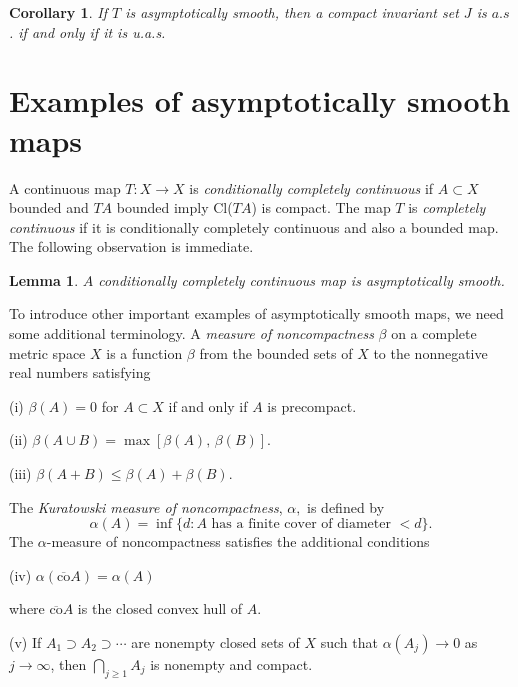 \documentclass{surv-l}
\theoremstyle{plain}
\newtheorem{corollary}[theorem]{Corollary}
\newtheorem{lemma}[theorem]{Lemma}
\theoremstyle{definition}
\numberwithin{equation}{section}
\numberwithin{figure}{chapter}
\begin{document}
\begin{corollary}\label{cor2.2.6} If $T$ is asymptotically smooth, then a compact invariant
set $J$ is $a.s$. if and only if it is u.a.s.
\end{corollary}

\section{Examples of asymptotically smooth maps}\label{sec2.3}

A continuous map $T\!:X\rightarrow X$ is \emph{conditionally completely continuous} if $A\subset X$ bounded and $TA$ bounded imply Cl($TA$) is compact. The map $T$ is \emph{completely continuous} if it is conditionally completely continuous and also a bounded map. The following observation is immediate.

\begin{lemma}\label{lem2.3.1} $A$ conditionally completely continuous map is asymptotically smooth.
\end{lemma}

To introduce other important examples of asymptotically smooth maps, we need some additional terminology. A \emph{measure of noncompactness} $\beta$ on a complete metric space $X$ is a function $\beta$ from the bounded sets of $X$ to the nonnegative real numbers satisfying

(i) $\beta(A)=0$ for $A\subset X$ if and only if $A$ is precompact.

(ii) $\beta(A\cup B)=\max[\beta(A), \, \beta(B)]$.

(iii) $\beta(A+B)\leq\beta(A)+\beta(B)$.

\noindent The \emph{Kuratowski measure of noncompactness}, $\alpha,$ is defined by
\begin{equation*}
\alpha(A)=\inf\{d\!:A  \text{ has a finite cover of diameter } <d\}.
\end{equation*}
The $\alpha$-measure of noncompactness satisfies the additional conditions

(iv) $\alpha(\overline{\mathrm{co}}A)=\alpha(A)$

where $\overline{\mathrm{co}}A$ is the closed convex hull of $A$.

(v) If $ A_{1}\supset A_{2}\supset \cdots$ are nonempty closed sets of $X$ such that $\alpha(A_{j})\rightarrow 0$ as $ j\rightarrow\infty$, then $ \bigcap_{j\geq 1}A_{j}$ is nonempty and compact.
\end{document}
